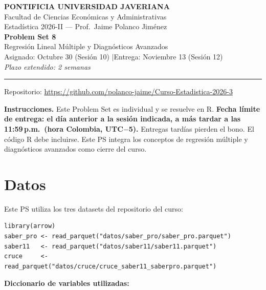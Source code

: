 \documentclass[11pt, a4paper]{article}
\begin{document}
\begin{center}
{\large\bfseries PONTIFICIA UNIVERSIDAD JAVERIANA}\\[3pt]
Facultad de Ciencias Econ\'omicas y Administrativas\\[2pt]
Estad\'istica 2026-II --- Prof.\ Jaime Polanco Jim\'enez\\[6pt]
{\LARGE\bfseries Problem Set 8}\\[3pt]
{\large Regresi\'on Lineal M\'ultiple y Diagn\'osticos Avanzados}\\[6pt]
Asignado: Octubre 30 (Sesi\'on 10) \quad$|$\quad Entrega: Noviembre 13 (Sesi\'on 12)\\[3pt]
\textit{Plazo extendido: 2 semanas}
\end{center}

\vspace{6pt}
\rule{\linewidth}{0.5pt}
\vspace{2pt}
{\centering\small Repositorio: \url{https://github.com/polanco-jaime/Curso-Estadistica-2026-3}\par}
\vspace{6pt}

\textbf{Instrucciones.} Este Problem Set es individual y se resuelve en R.
\textbf{Fecha l\'imite de entrega: el d\'ia anterior a la sesi\'on indicada, a m\'as tardar a las 11:59\,p.m.\ (hora Colombia, UTC$-$5).} Entregas tard\'ias pierden el bono. El c\'odigo R debe incluirse. Este PS integra los conceptos de regresi\'on
m\'ultiple y diagn\'osticos avanzados como cierre del curso.

\section*{Datos}

Este PS utiliza los tres datasets del repositorio del curso:

\begin{lstlisting}
library(arrow)
saber_pro <- read_parquet("datos/saber_pro/saber_pro.parquet")
saber11   <- read_parquet("datos/saber11/saber11.parquet")
cruce     <- read_parquet("datos/cruce/cruce_saber11_saberpro.parquet")
\end{lstlisting}

\textbf{Diccionario de variables utilizadas:}
\end{document}
